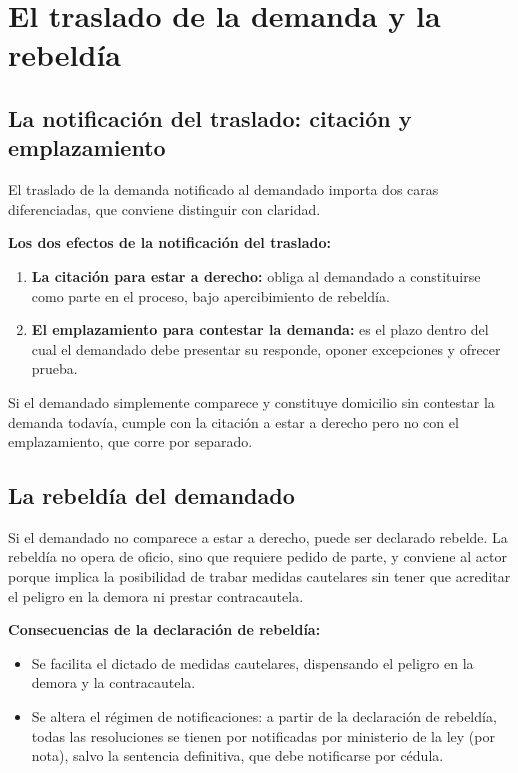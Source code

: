 \documentclass[12pt,oneside]{book}
\begin{document}
\chapter{El traslado de la demanda y la rebeldía}

\section{La notificación del traslado: citación y emplazamiento}

El traslado de la demanda notificado al demandado importa dos caras diferenciadas, que conviene distinguir con claridad.

\begin{important}
\textbf{Los dos efectos de la notificación del traslado:}
\begin{enumerate}
    \item \textbf{La citación para estar a derecho:} obliga al demandado a constituirse como parte en el proceso, bajo apercibimiento de rebeldía.
    \item \textbf{El emplazamiento para contestar la demanda:} es el plazo dentro del cual el demandado debe presentar su responde, oponer excepciones y ofrecer prueba.
\end{enumerate}
\end{important}

Si el demandado simplemente comparece y constituye domicilio sin contestar la demanda todavía, cumple con la citación a estar a derecho pero no con el emplazamiento, que corre por separado.

\section{La rebeldía del demandado}

Si el demandado no comparece a estar a derecho, puede ser declarado rebelde. La rebeldía no opera de oficio, sino que requiere pedido de parte, y conviene al actor porque implica la posibilidad de trabar medidas cautelares sin tener que acreditar el peligro en la demora ni prestar contracautela.

\begin{important}
\textbf{Consecuencias de la declaración de rebeldía:}
\begin{itemize}
    \item Se facilita el dictado de medidas cautelares, dispensando el peligro en la demora y la contracautela.
    \item Se altera el régimen de notificaciones: a partir de la declaración de rebeldía, todas las resoluciones se tienen por notificadas por ministerio de la ley (por nota), salvo la sentencia definitiva, que debe notificarse por cédula.
\end{itemize}
\end{important}
\end{document}
